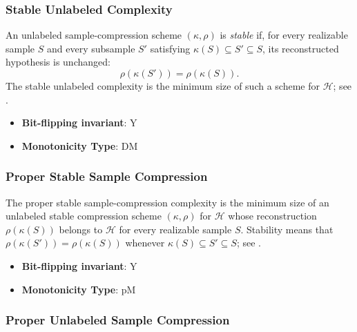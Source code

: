 \subsubsection{Stable Unlabeled Complexity}
      
      \begin{definition}\label{def:stable_unlabeled_complexity}
      An unlabeled sample-compression scheme $(\kappa,\rho)$ is \emph{stable} if, for every realizable sample $S$ and every subsample $S'$ satisfying $\kappa(S)\subseteq S'\subseteq S$, its reconstructed hypothesis is unchanged:
      \[
          \rho(\kappa(S'))=\rho(\kappa(S)).
      \]
      The stable unlabeled complexity is the minimum size of such a scheme for $\mathcal H$; see \cite{bousquet2020proper,hanneke2021stable}.
      \end{definition}
      \begin{itemize}
      \item {\bf Bit-flipping invariant}: Y
      \item {\bf Monotonicity Type}: DM
      \end{itemize}
\subsubsection{Proper Stable Sample Compression}
      
      \begin{definition}\label{def:proper_stable_sample_compression}
      The proper stable sample-compression complexity is the minimum size of an unlabeled stable compression scheme $(\kappa,\rho)$ for $\mathcal H$ whose reconstruction $\rho(\kappa(S))$ belongs to $\mathcal H$ for every realizable sample $S$.  Stability means that $\rho(\kappa(S'))=\rho(\kappa(S))$ whenever $\kappa(S)\subseteq S'\subseteq S$; see \cite{bousquet2020proper,hanneke2021stable}.
      \end{definition}
      \begin{itemize}
      \item {\bf Bit-flipping invariant}: Y
      \item {\bf Monotonicity Type}: pM
      \end{itemize}
\subsubsection{Proper Unlabeled Sample Compression}
      

